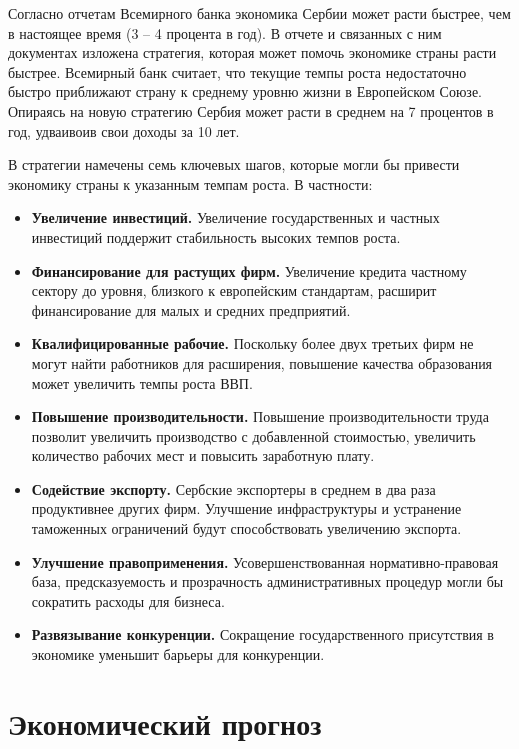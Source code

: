 Согласно отчетам Всемирного банка экономика Сербии может расти быстрее, чем в настоящее время (3 -- 4 процента в год).
В отчете \cite{worldbank_cem} и связанных с ним документах \cite{worldbank_investment,worldbank_financing, worldbank_productivity, worldbank_encouraging, worldbank_labormarket, worldbank_barriers, worldbank_aid, worldbank_workforce} изложена стратегия, которая может помочь экономике страны расти быстрее.
Всемирный банк считает, что текущие темпы роста недостаточно быстро приближают страну к среднему уровню жизни в Европейском Союзе.
Опираясь на новую стратегию Сербия может расти в среднем на 7 процентов в год, удваивоив свои доходы за 10 лет.

В стратегии намечены семь ключевых шагов, которые могли бы привести экономику страны к указанным темпам роста.
В частности:
\begin{itemize}
	\item \textbf{Увеличение инвестиций.}
	Увеличение государственных и частных инвестиций поддержит стабильность высоких темпов роста.
	\item \textbf{Финансирование для растущих фирм.}
	Увеличение кредита частному сектору до уровня, близкого к европейским стандартам, расширит финансирование для малых и средних предприятий.
	\item \textbf{Квалифицированные рабочие.}
	Поскольку более двух третьих фирм не могут найти работников для расширения, повышение качества образования может увеличить темпы роста ВВП.
	\item \textbf{Повышение производительности.}
	Повышение производительности труда позволит увеличить производство с добавленной стоимостью, увеличить количество рабочих мест и повысить заработную плату.
	\item \textbf{Содействие экспорту.}
	Сербские экспортеры в среднем в два раза продуктивнее других фирм.
	Улучшение инфраструктуры и устранение таможенных ограничений будут способствовать увеличению экспорта.
	\item \textbf{Улучшение правоприменения.}
	Усовершенствованная нормативно-правовая база, предсказуемость и прозрачность административных процедур могли бы сократить расходы для бизнеса.
	\item \textbf{Развязывание конкуренции.}
	Сокращение государственного присутствия в экономике уменьшит барьеры для конкуренции.
\end{itemize}

\section{Экономический прогноз}

